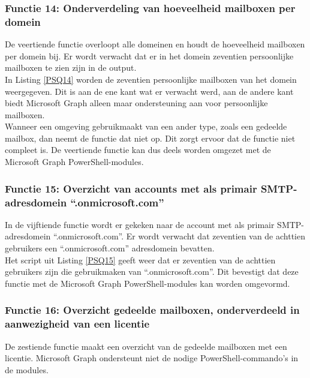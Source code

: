 \subsubsection{Functie 14: Onderverdeling van hoeveelheid mailboxen per domein}


De veertiende functie overloopt alle domeinen en houdt de hoeveelheid mailboxen per domein bij. Er wordt verwacht dat er in het domein zeventien persoonlijke mailboxen te zien zijn in de output. \\

In Listing \ref{PSQ14} worden de zeventien persoonlijke mailboxen van het domein weergegeven. Dit is aan de ene kant wat er verwacht werd, aan de andere kant biedt Microsoft Graph alleen maar ondersteuning aan voor persoonlijke mailboxen. \\

Wanneer een omgeving gebruikmaakt van een ander type, zoals een gedeelde mailbox, dan neemt de functie dat niet op. Dit zorgt ervoor dat de functie niet compleet is. De veertiende functie kan dus deels worden omgezet met de Microsoft Graph PowerShell-modules.

\subsubsection{Functie 15: Overzicht van accounts met als primair SMTP-adresdomein “.onmicrosoft.com”}


In de vijftiende functie wordt er gekeken naar de account met als primair \Ac{SMTP}-adresdomein “.onmicrosoft.com”. Er wordt verwacht dat zeventien van de achttien gebruikers een “.onmicrosoft.com” adresdomein bevatten. \\

Het script uit Listing \ref{PSQ15} geeft weer dat er zeventien van de achttien gebruikers zijn die gebruikmaken van “.onmicrosoft.com”. Dit bevestigt dat deze functie met de Microsoft Graph PowerShell-modules kan worden omgevormd.

\subsubsection{Functie 16: Overzicht gedeelde mailboxen, onderverdeeld in aanwezigheid van een licentie}


De zestiende functie maakt een overzicht van de gedeelde mailboxen met een licentie. Microsoft Graph ondersteunt niet de nodige PowerShell-commando's in de modules. \\

